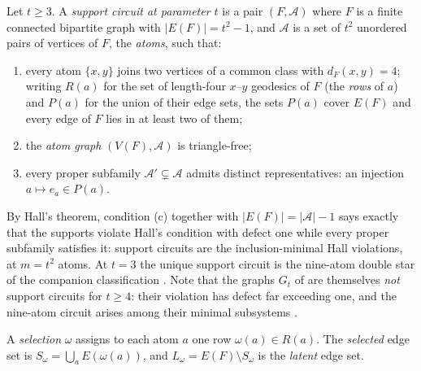 \begin{definition}\label{def:t5circuit}
Let \(t\ge3\). A \emph{support circuit at parameter \(t\)} is a pair
\((F,\mathcal A)\) where \(F\) is a finite connected bipartite graph
with \(|E(F)|=t^2-1\), and \(\mathcal A\) is a set of \(t^2\) unordered
pairs of vertices of \(F\), the \emph{atoms}, such that:
\begin{enumerate}[label=\textup{(\alph*)}]
\item every atom \(\{x,y\}\) joins two vertices of a common class with
\(d_F(x,y)=4\); writing \(R(a)\) for the set of length-four
\(x\)--\(y\) geodesics of \(F\) (the \emph{rows} of \(a\)) and
\(P(a)\) for the union of their edge sets, the sets \(P(a)\) cover
\(E(F)\) and every edge of \(F\) lies in at least two of them;
\item the \emph{atom graph} \((V(F),\mathcal A)\) is triangle-free;
\item every proper subfamily \(\mathcal A'\subsetneq\mathcal A\) admits
distinct representatives: an injection \(a\mapsto e_a\in P(a)\).
\end{enumerate}
\end{definition}

By Hall's theorem, condition (c) together with
\(|E(F)|=|\mathcal A|-1\) says exactly that the supports violate
Hall's condition with defect one while every proper subfamily
satisfies it: support circuits are the inclusion-minimal Hall
violations, at \(m=t^2\) atoms. At \(t=3\) the unique support circuit
is the nine-atom double star of the companion classification
\cite{Ferudun26supports}. Note
that the graphs \(G_t\) of \cite{Ferudun26supports} are themselves
\emph{not} support circuits for
\(t\ge4\): their violation has defect far exceeding one, and the
nine-atom circuit arises among their minimal subsystems
\cite{Ferudun26supports}.

\begin{definition}\label{def:selection}
A \emph{selection} \(\omega\) assigns to each atom \(a\) one row
\(\omega(a)\in R(a)\). The \emph{selected} edge set is
\(S_\omega=\bigcup_{a}E(\omega(a))\), and \(L_\omega=E(F)\setminus
S_\omega\) is the \emph{latent} edge set.
\end{definition}

